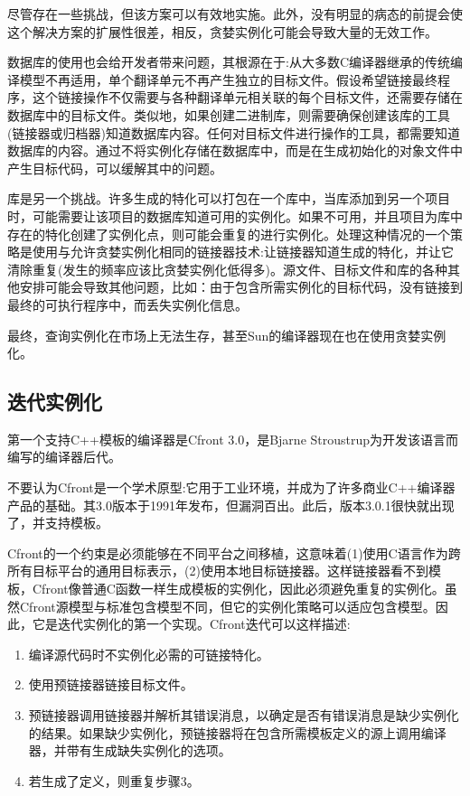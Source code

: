 尽管存在一些挑战，但该方案可以有效地实施。此外，没有明显的病态的前提会使这个解决方案的扩展性很差，相反，贪婪实例化可能会导致大量的无效工作。

数据库的使用也会给开发者带来问题，其根源在于:从大多数C编译器继承的传统编译模型不再适用，单个翻译单元不再产生独立的目标文件。假设希望链接最终程序，这个链接操作不仅需要与各种翻译单元相关联的每个目标文件，还需要存储在数据库中的目标文件。类似地，如果创建二进制库，则需要确保创建该库的工具(链接器或归档器)知道数据库内容。任何对目标文件进行操作的工具，都需要知道数据库的内容。通过不将实例化存储在数据库中，而是在生成初始化的对象文件中产生目标代码，可以缓解其中的问题。

库是另一个挑战。许多生成的特化可以打包在一个库中，当库添加到另一个项目时，可能需要让该项目的数据库知道可用的实例化。如果不可用，并且项目为库中存在的特化创建了实例化点，则可能会重复的进行实例化。处理这种情况的一个策略是使用与允许贪婪实例化相同的链接器技术:让链接器知道生成的特化，并让它清除重复(发生的频率应该比贪婪实例化低得多)。源文件、目标文件和库的各种其他安排可能会导致其他问题，比如：由于包含所需实例化的目标代码，没有链接到最终的可执行程序中，而丢失实例化信息。

最终，查询实例化在市场上无法生存，甚至Sun的编译器现在也在使用贪婪实例化。

\subsection{迭代实例化}

第一个支持C++模板的编译器是Cfront 3.0，是Bjarne Stroustrup为开发该语言而编写的编译器后代。

\begin{notice}
不要认为Cfront是一个学术原型:它用于工业环境，并成为了许多商业C++编译器产品的基础。其3.0版本于1991年发布，但漏洞百出。此后，版本3.0.1很快就出现了，并支持模板。
\end{notice}

Cfront的一个约束是必须能够在不同平台之间移植，这意味着(1)使用C语言作为跨所有目标平台的通用目标表示，(2)使用本地目标链接器。这样链接器看不到模板，Cfront像普通C函数一样生成模板的实例化，因此必须避免重复的实例化。虽然Cfront源模型与标准包含模型不同，但它的实例化策略可以适应包含模型。因此，它是迭代实例化的第一个实现。Cfront迭代可以这样描述:

\begin{enumerate}
\item 
编译源代码时不实例化必需的可链接特化。

\item 
使用预链接器链接目标文件。

\item 
预链接器调用链接器并解析其错误消息，以确定是否有错误消息是缺少实例化的结果。如果缺少实例化，预链接器将在包含所需模板定义的源上调用编译器，并带有生成缺失实例化的选项。

\item 
若生成了定义，则重复步骤3。
\end{enumerate}

